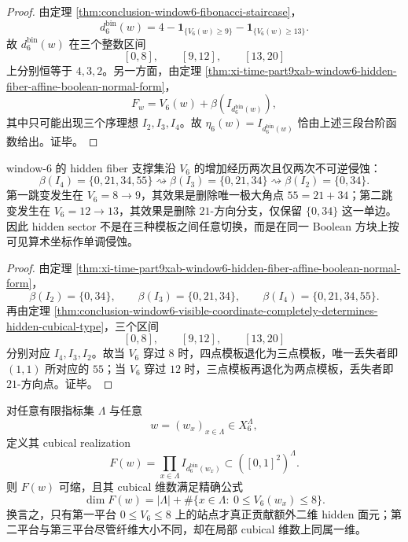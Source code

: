 \begin{proof}
由定理 \ref{thm:conclusion-window6-fibonacci-staircase}，
\[
d_6^{\mathrm{bin}}(w)=4-\mathbf 1_{\{V_6(w)\ge 9\}}-\mathbf 1_{\{V_6(w)\ge 13\}}.
\]
故 \(d_6^{\mathrm{bin}}(w)\) 在三个整数区间
\[
[0,8],\qquad [9,12],\qquad [13,20]
\]
上分别恒等于 \(4,3,2\)。另一方面，由定理 \ref{thm:xi-time-part9xab-window6-hidden-fiber-affine-boolean-normal-form}，
\[
F_w=V_6(w)+\beta(I_{d_6^{\mathrm{bin}}(w)}),
\]
其中只可能出现三个序理想 \(I_2,I_3,I_4\)。故 \(\eta_6(w)=I_{d_6^{\mathrm{bin}}(w)}\) 恰由上述三段台阶函数给出。证毕。
\end{proof}

\begin{corollary}\label{cor:conclusion-window6-boolean-square-double-erosion}
window-\(6\) 的 hidden fiber 支撑集沿 \(V_6\) 的增加经历两次且仅两次不可逆侵蚀：
\[
\beta(I_4)=\{0,21,34,55\}
\rightsquigarrow
\beta(I_3)=\{0,21,34\}
\rightsquigarrow
\beta(I_2)=\{0,34\}.
\]
第一跳变发生在 \(V_6=8\to 9\)，其效果是删除唯一极大角点 \(55=21+34\)；第二跳变发生在 \(V_6=12\to 13\)，其效果是删除 \(21\)-方向分支，仅保留 \(\{0,34\}\) 这一单边。因此 hidden sector 不是在三种模板之间任意切换，而是在同一 Boolean 方块上按可见算术坐标作单调侵蚀。
\end{corollary}

\begin{proof}
由定理 \ref{thm:xi-time-part9xab-window6-hidden-fiber-affine-boolean-normal-form}，
\[
\beta(I_2)=\{0,34\},
\qquad
\beta(I_3)=\{0,21,34\},
\qquad
\beta(I_4)=\{0,21,34,55\}.
\]
再由定理 \ref{thm:conclusion-window6-visible-coordinate-completely-determines-hidden-cubical-type}，三个区间
\[
[0,8],\qquad [9,12],\qquad [13,20]
\]
分别对应 \(I_4,I_3,I_2\)。故当 \(V_6\) 穿过 \(8\) 时，四点模板退化为三点模板，唯一丢失者即 \((1,1)\) 所对应的 \(55\)；当 \(V_6\) 穿过 \(12\) 时，三点模板再退化为两点模板，丢失者即 \(21\)-方向点。证毕。
\end{proof}

\begin{theorem}\label{thm:conclusion-window6-finite-volume-hidden-fiber-cubical-dimension-law}
对任意有限指标集 \(\Lambda\) 与任意
\[
w=(w_x)_{x\in\Lambda}\in X_6^\Lambda,
\]
定义其 cubical realization
\[
F(w)=\prod_{x\in\Lambda} I_{d_6^{\mathrm{bin}}(w_x)}\subset ([0,1]^2)^\Lambda.
\]
则 \(F(w)\) 可缩，且其 cubical 维数满足精确公式
\[
\dim F(w)
=
|\Lambda|+\#\{x\in\Lambda:\ 0\le V_6(w_x)\le 8\}.
\]
换言之，只有第一平台 \(0\le V_6\le 8\) 上的站点才真正贡献额外二维 hidden 面元；第二平台与第三平台尽管纤维大小不同，却在局部 cubical 维数上同属一维。
\end{theorem}

